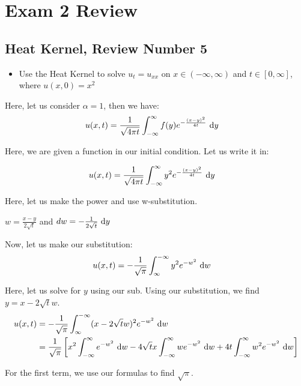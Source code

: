\section{Exam 2 Review}


\subsection*{Heat Kernel, Review Number 5}

\begin{itemize}
  \item Use the Heat Kernel to solve $u_t = u_{xx}$ on $x \in (-\infty, \infty)$ and $t \in [0, \infty]$, where $u(x, 0) = x^2$
\end{itemize}

Here, let us consider $\alpha = 1$, then we have:
%
\begin{align}
  u(x, t) & = \frac{1}{\sqrt{4 \pi t}} \int^\infty_{-\infty} f(y) e^{-\frac{(x - y)^2}{4t}}\ \text dy
\end{align}

Here, we are given a function in our initial condition. Let us write it in:

\begin{align}
  u(x, t) & = \frac{1}{\sqrt{4 \pi t}} \int^\infty_{-\infty} y^2 e^{-\frac{(x - y)^2}{4t}}\ \text dy
\end{align}

Here, let us make the power and use w-substitution.

$w = \frac{x - y}{2\sqrt t}$ and $dw = -\frac{1}{2 \sqrt t}\ \text dy$

Now, let us make our substitution:
%
\begin{align}
  u(x, t) & = - \frac{1}{\sqrt \pi} \int^{-\infty}_{\infty} y^2 e^{-w^2}\ \text dw
\end{align}

Here, let us solve for $y$ using our sub. Using our substitution, we find $y = x - 2 \sqrt t w$.
%
\begin{align}
  u(x, t) & = - \frac{1}{\sqrt \pi} \int^{-\infty}_{\infty} (x - 2 \sqrt t w)^2 e^{-w^2}\ \text dw\\
  & = \frac{1}{\sqrt \pi}
  \left[
  x^2 \int^\infty_{-\infty} e^{-w^2}\ \text dw
  - 4 \sqrt t x \int^\infty_{-\infty} w e^{-w^2}\ \text dw
  + 4t \int^\infty_{-\infty} w^2 e^{-w^2}\ \text dw
  \right]
\end{align}

For the first term, we use our formulas to find $\sqrt \pi$.

